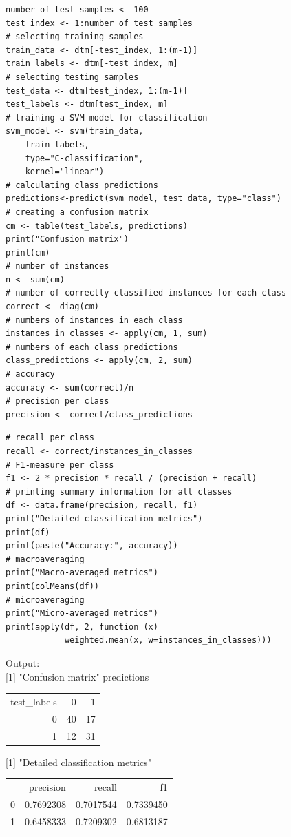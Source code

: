 \documentclass[10pt]{book}
\begin{document}
\begin{verbatim}
number_of_test_samples <- 100
test_index <- 1:number_of_test_samples
# selecting training samples
train_data <- dtm[-test_index, 1:(m-1)]
train_labels <- dtm[-test_index, m]
# selecting testing samples
test_data <- dtm[test_index, 1:(m-1)]
test_labels <- dtm[test_index, m]
# training a SVM model for classification
svm_model <- svm(train_data,
    train_labels,
    type="C-classification",
    kernel="linear")
# calculating class predictions
predictions<-predict(svm_model, test_data, type="class")
# creating a confusion matrix
cm <- table(test_labels, predictions)
print("Confusion matrix")
print(cm)
# number of instances
n <- sum(cm)
# number of correctly classified instances for each class
correct <- diag(cm)
# numbers of instances in each class
instances_in_classes <- apply(cm, 1, sum)
# numbers of each class predictions
class_predictions <- apply(cm, 2, sum)
# accuracy
accuracy <- sum(correct)/n
# precision per class
precision <- correct/class_predictions
\end{verbatim}

\begin{verbatim}
# recall per class
recall <- correct/instances_in_classes
# F1-measure per class
f1 <- 2 * precision * recall / (precision + recall)
# printing summary information for all classes
df <- data.frame(precision, recall, f1)
print("Detailed classification metrics")
print(df)
print(paste("Accuracy:", accuracy))
# macroaveraging
print("Macro-averaged metrics")
print(colMeans(df))
# microaveraging
print("Micro-averaged metrics")
print(apply(df, 2, function (x)
            weighted.mean(x, w=instances_in_classes)))
\end{verbatim}

Output:\\[0pt]
[1] "Confusion matrix" predictions

\begin{center}
\begin{tabular}{rrr}
test\_labels & 0 & 1 \\
0 & 40 & 17 \\
1 & 12 & 31 \\
\end{tabular}
\end{center}

[1] "Detailed classification metrics"

\begin{center}
\begin{tabular}{rrrr}
 & precision & recall & f1 \\
0 & 0.7692308 & 0.7017544 & 0.7339450 \\
1 & 0.6458333 & 0.7209302 & 0.6813187 \\
\end{tabular}
\end{center}
\end{document}
